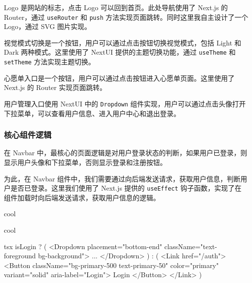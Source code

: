 Logo 是网站的标志，点击 Logo 可以回到首页。此处导航使用了 Next.js 的 Router，通过 \texttt{useRouter} 和 \texttt{push} 方法实现页面跳转。同时这里我自主设计了一个 Logo，通过 SVG 图片实现。

视觉模式切换是一个按钮，用户可以通过点击按钮切换视觉模式，包括 Light 和 Dark 两种模式。这里使用了 NextUI 提供的主题切换功能，通过 \texttt{useTheme} 和 \texttt{setTheme} 方法实现主题切换。

心愿单入口是一个按钮，用户可以通过点击按钮进入心愿单页面。这里使用了 Next.js 的 Router 实现页面跳转。

用户管理入口使用 NextUI 中的 \texttt{Dropdown} 组件实现，用户可以通过点击头像打开下拉菜单，可以查看用户信息、进入用户中心和退出登录。

\subsubsection{核心组件逻辑}

在 Navbar 中，最核心的页面逻辑是对用户登录状态的判断，如果用户已登录，则显示用户头像和下拉菜单，否则显示登录和注册按钮。

为此，在 Navbar 组件中，我们需要通过向后端发送请求，获取用户信息，判断用户是否已登录。这里我们使用了 Next.js 提供的 \texttt{useEffect} 钩子函数，实现了在组件加载时向后端发送请求，获取用户信息的逻辑。

\begin{codebox}{}{cool}
\end{codebox}

\begin{codebox}{}{cool}
\begin{amzcode}{tsx}
{isLogin ? (
<Dropdown placement="bottom-end" className="text-foreground bg-background">
    ...
</Dropdown>
) : (
<Link href="/auth">
    <Button className="bg-primary-500 text-primary-50" color="primary" variant="solid" aria-label="Login">
        Login
    </Button>
</Link>
)}
\end{amzcode}
\end{codebox}

